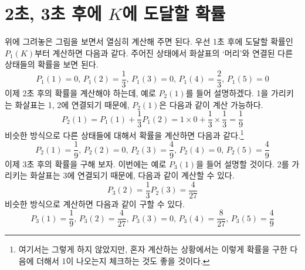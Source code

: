 \documentclass{scrartcl}
\begin{document}
\section{2초, 3초 후에 \(K\)에 도달할 확률}
위에 그려놓은 그림을 보면서 열심히 계산해 주면 된다. 우선 1초 후에 도달할 확률인 \(P_1(K)\)부터 계산하면 다음과 같다. 주어진 상태에서 화살표의 `머리'와 연결된 다른 상태들의 확률을 보면 된다.
\[P_1(1)=0,\,P_1(2)=\frac{1}{3},\,P_1(3)=0,\,P_1(4)=\frac{2}{3},\,P_1(5)=0\]
이제 2초 후의 확률을 계산해야 하는데, 예로 \(P_2(1)\)를 들어 설명하겠다. 1을 가리키는 화살표는 1, 2에 연결되기 때문에, \(P_2(1)\)은 다음과 같이 계산 가능하다.
\[P_2(1)=P_1(1)+\frac{1}{3}P_1(2)=1\times 0+\frac{1}{3}\times\frac{1}{3}=\frac{1}{9}\]
비슷한 방식으로 다른 상태들에 대해서 확률을 계산하면 다음과 같다.\footnote{여기서는 그렇게 하지 않았지만, 혼자 계산하는 상황에서는 이렇게 확률을 구한 다음에 더해서 1이 나오는지 체크하는 것도 좋을 것이다.}
\[\boxed{P_2(1)=\frac{1}{9},\,P_2(2)=0,\,P_2(3)=\frac{4}{9},\,P_2(4)=0,\,P_2(5)=\frac{4}{9}}\]
이제 3초 후의 확률을 구해 보자. 이번에는 예로 \(P_3(1)\)을 들어 설명할 것이다. 2를 가리키는 화살표는 3에 연결되기 때문에, 다음과 같이 계산할 수 있다.
\[P_3(2)=\frac{1}{3}P_2(3)=\frac{4}{27}\]
비슷한 방식으로 계산하면 다음과 같이 구할 수 있다.
\[\boxed{P_3(1)=\frac{1}{9},\,P_3(2)=\frac{4}{27},\,P_3(3)=0,\,P_3(4)=\frac{8}{27},\,P_3(5)=\frac{4}{9}}\]
\end{document}
